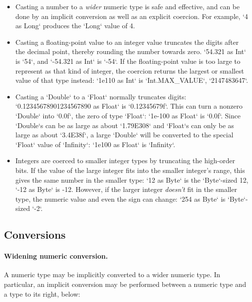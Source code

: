 \begin{itemize}
\item Casting a number to a {\em wider} numeric type is safe and effective,
      and can be done by an implicit conversion as well as an explicit
      coercion.  For example, \xcd`4 as Long` produces the \xcd`Long` value of
      4. 
\item Casting a floating-point value to an integer value truncates the digits
      after the decimal point, thereby rounding the number towards zero.  
      \xcd`54.321 as Int` is \xcd`54`, and 
      \xcd`-54.321 as Int` is \xcd`-54`.
      If the floating-point value is too large to represent as that kind of
      integer, the coercion returns the largest or smallest value of that type
      instead: \xcd`1e110 as Int` is 
      \xcd`Int.MAX_VALUE`, \xcd`2147483647`. 

\item Casting a \xcd`Double` to a \xcd`Float` normally truncates digits: 
      \xcd`0.12345678901234567890 as Float` is \xcd`0.12345679f`.  This can
      turn a nonzero \xcd`Double` into \xcd`0.0f`, the zero of type
      \xcd`Float`: 
      \xcd`1e-100 as Float` is \xcd`0.0f`.  Since 
      \xcd`Double`s can be as large as about \xcd`1.79E308` and \xcd`Float`s
      can only be as large as about \xcd`3.4E38f`, a large \xcd`Double` will
      be converted to the special \xcd`Float` value of \xcd`Infinity`: 
      \xcd`1e100 as Float` is \xcd`Infinity`.
\item Integers are coerced to smaller integer types by truncating the
      high-order bits. If the value of the large integer fits into the smaller
      integer's range, this gives the same number in the smaller type: 
      \xcd`12 as Byte` is the \xcd`Byte`-sized 12, 
      \xcd`-12 as Byte` is -12. 
      However, if the larger integer {\em doesn't} fit in the smaller type,
      the numeric value and even the sign can change: \xcd`254 as Byte` is
      \xcd`Byte`-sized \xcd`-2`.  


\end{itemize}

\subsection{Conversions}

\paragraph{Widening numeric conversion.}
A numeric type may be implicitly converted to a wider numeric type. In
particular, an implicit conversion may be performed between a numeric
type and a type to its right, below:


